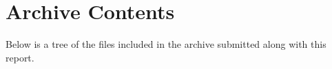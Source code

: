 \chapter{Archive Contents} %
\label{apdx:archive_contents}

Below is a tree of the files included in the archive submitted along with this report.

